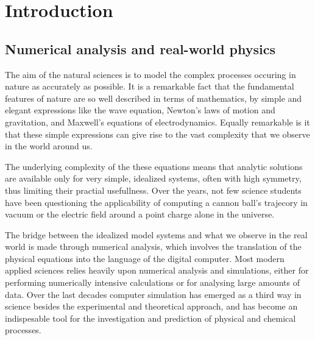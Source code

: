 \chapter{Introduction}
\section{Numerical analysis and real-world physics}
The aim of the natural sciences is to model the complex processes occuring in
nature as accurately as possible. It is a remarkable fact that the fundamental 
features of nature are so well described in terms of mathematics, by simple 
and elegant expressions like the wave equation, Newton's laws of motion and 
gravitation, and Maxwell's equations of electrodynamics. Equally remarkable 
is it that these simple expressions can give rise to the vast complexity that 
we observe in the world around us.

The underlying complexity of the these equations means that analytic solutions 
are available only for very simple, idealized systems, often with high symmetry, 
thus limiting their practial usefullness. Over the years, not few science students 
have been questioning the applicability of computing a cannon ball's 
trajecory in vacuum or the electric field around a point charge alone in the universe.


The bridge between the idealized model systems and what we observe in the real 
world is made through numerical analysis, which involves the translation of the 
physical equations into the language of the digital computer. Most modern applied 
sciences relies heavily upon numerical analysis and simulations, either for 
performing numerically intensive calculations or for analysing large amounts of 
data. Over the last decades computer simulation has emerged as a third way in 
science besides the experimental and theoretical approach, and has become an 
indispesable tool for the investigation and prediction of physical and chemical 
processes.

